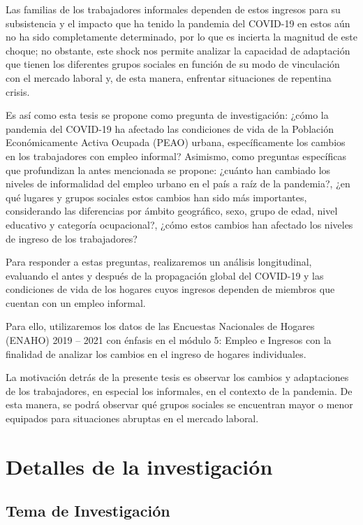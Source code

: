 \documentclass[
  letterpaper,
  12pt,
  oneside,
  spanish,
  doublespacing,
  headsepline,
  parskip]{MastersDoctoralThesis}
\begin{document}
Las familias de los trabajadores informales dependen de estos ingresos
para su subsistencia y el impacto que ha tenido la pandemia del COVID-19
en estos aún no ha sido completamente determinado, por lo que es
incierta la magnitud de este choque; no obstante, este shock nos permite
analizar la capacidad de adaptación que tienen los diferentes grupos
sociales en función de su modo de vinculación con el mercado laboral y,
de esta manera, enfrentar situaciones de repentina crisis.

Es así como esta tesis se propone como pregunta de investigación: ¿cómo
la pandemia del COVID-19 ha afectado las condiciones de vida de la
Población Económicamente Activa Ocupada (PEAO) urbana, específicamente
los cambios en los trabajadores con empleo informal? Asimismo, como
preguntas específicas que profundizan la antes mencionada se propone:
¿cuánto han cambiado los niveles de informalidad del empleo urbano en el
país a raíz de la pandemia?, ¿en qué lugares y grupos sociales estos
cambios han sido más importantes, considerando las diferencias por
ámbito geográfico, sexo, grupo de edad, nivel educativo y categoría
ocupacional?, ¿cómo estos cambios han afectado los niveles de ingreso de
los trabajadores?

Para responder a estas preguntas, realizaremos un análisis longitudinal,
evaluando el antes y después de la propagación global del COVID-19 y las
condiciones de vida de los hogares cuyos ingresos dependen de miembros
que cuentan con un empleo informal.

Para ello, utilizaremos los datos de las Encuestas Nacionales de Hogares
(ENAHO) 2019 -- 2021 con énfasis en el módulo 5: Empleo e Ingresos con
la finalidad de analizar los cambios en el ingreso de hogares
individuales.

La motivación detrás de la presente tesis es observar los cambios y
adaptaciones de los trabajadores, en especial los informales, en el
contexto de la pandemia. De esta manera, se podrá observar qué grupos
sociales se encuentran mayor o menor equipados para situaciones abruptas
en el mercado laboral.


\hypertarget{sec-detalles}{%
\chapter{Detalles de la investigación}\label{sec-detalles}}

\hypertarget{tema-de-investigaciuxf3n}{%
\section{Tema de Investigación}\label{tema-de-investigaciuxf3n}}
\end{document}
